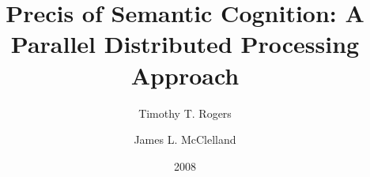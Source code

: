 \documentclass[a4paper,12pt]{article}
\title{Precis of Semantic Cognition: A Parallel Distributed Processing Approach}
\author{Timothy T. Rogers \and James L. McClelland}
\date{2008}
\begin{document}
{\scshape\bfseries \maketitle}







\end{document}
